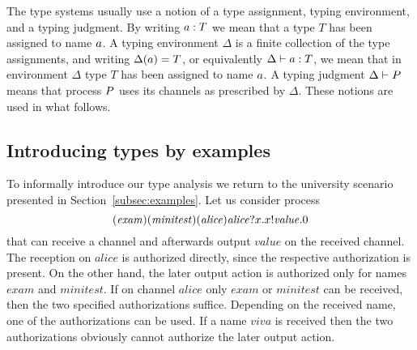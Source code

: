 The type systems usually use a notion of a type assignment, typing environment, and a typing judgment. 
By writing $a: T$ we mean that a type $T$  has been assigned to name $a$. A typing environment $\Delta$ is a finite collection of the type assignments, and writing $\Delta(a)=T$, or equivalently $\Delta \vdash a:T$, we mean that in environment $\Delta$ type $T$ has been assigned to name $a$. A typing judgment $\Delta \vdash P$ means that process $P$ uses its channels as prescribed by $\Delta$. These notions are used in what follows. 


\subsection{Introducing types by examples}\label{sec:types_intro_examples}
To informally introduce our type analysis we return to the university scenario presented in Section~\ref{subsec:examples}. Let us consider process
$$
(\mathit{exam})(\mathit{minitest})
(\mathit{alice})\mathit{alice}?x.
x!\mathit{value}. 0
$$
that can receive a channel and afterwards output $\mathit{value}$ on the received channel. The reception on $\mathit{alice}$ is authorized directly, since the respective authorization is present. On the other hand, the later output action is authorized only for names $\mathit{exam}$ and $\mathit{minitest}$. If on channel $\mathit{alice}$ only $\mathit{exam}$ or $\mathit{minitest}$ can be received, then the two specified authorizations suffice. 
Depending on the received name, one of the authorizations can be used.  
If a name 
$\mathit{viva}$ is received %
then the two authorizations obviously cannot authorize the later output action. 

